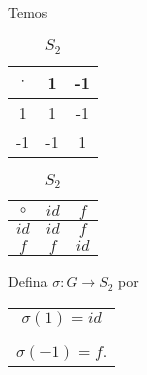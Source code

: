 \documentclass{beamer}
\begin{document}
    \begin{frame}
        Temos \pause
        \begin{table}
            \begin{minipage}{.5\linewidth}
                \caption*{$G$}
                \centering
                \begin{tabular}{|c|c|c|}
                    \hline
                    $\cdot$ & 1 & -1\\
                    \hline
                    1 & 1 & -1\\
                    \hline
                    -1 & -1 & 1\\
                    \hline
                \end{tabular}
            \end{minipage}%
            \pause
            \begin{minipage}{.5\linewidth}
                \caption*{$S_2$}
                \centering
                \begin{tabular}{|c|c|c|}
                    \hline
                    $\circ$ & $id$ & $f$\\
                    \hline
                    $id$ & $id$ & $f$\\
                    \hline
                    $f$ & $f$ & $id$\\
                    \hline
                \end{tabular}
            \end{minipage}\pause
        \end{table}

        \vspace{.4cm}

        Defina $\sigma : G \to S_2$ por \pause
        \begin{center}
            \begin{tabular}{c}
                $\sigma(1) = id$ \pause\\
                \vspace{.3cm}\\
                $\sigma(-1) = f$.
            \end{tabular}
        \end{center}
    \end{frame}
\end{document}
